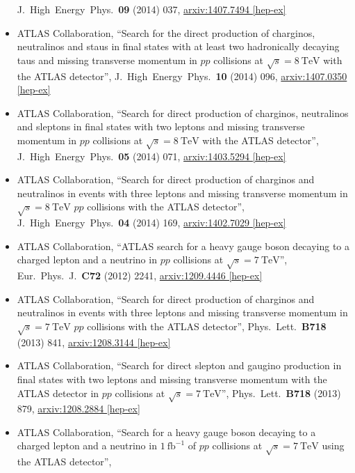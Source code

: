 \documentclass[a4paper,10pt]{article}
\begin{document}
\begin{itemize}
	J.\ High\ Energy\ Phys.\ {\bf 09} (2014) 037,
	\href{http://arxiv.org/abs/1407.7494}{arxiv:1407.7494 [hep-ex]}
	\item ATLAS Collaboration,
	``Search for the direct production of charginos, neutralinos and staus in final states with at least two hadronically decaying taus and missing transverse momentum in $pp$ collisions at $\sqrt{s} = 8\ \mathrm{TeV}$ with the ATLAS detector'',
	J.\ High\ Energy\ Phys.\ {\bf 10} (2014) 096,
	\href{http://arxiv.org/abs/1407.0350}{arxiv:1407.0350 [hep-ex]}
	\item ATLAS Collaboration,
	``Search for direct production of charginos, neutralinos and sleptons in final states with two leptons and missing transverse momentum in $pp$ collisions at
	$\sqrt{s} = 8\ \mathrm{TeV}$ with the ATLAS detector'',
	J.\ High\ Energy\ Phys.\ {\bf 05} (2014) 071,
	\href{http://arxiv.org/abs/1403.5294}{arxiv:1403.5294 [hep-ex]}
	\item ATLAS Collaboration,
	``Search for direct production of charginos and neutralinos in events with three leptons and missing transverse momentum in $\sqrt{s} = 8\ \mathrm{TeV}$ $pp$ collisions with the ATLAS detector'',
	J.\ High\ Energy\ Phys.\ {\bf 04} (2014) 169,
	\href{http://arxiv.org/abs/1402.7029}{arxiv:1402.7029 [hep-ex]}
	\item ATLAS Collaboration,
	``ATLAS search for a heavy gauge boson decaying to a charged lepton and a neutrino in $pp$ collisions at $\sqrt{s} = 7\ \mathrm{TeV}$'',
	Eur.\ Phys.\ J.\ {\bf C72} (2012) 2241,
	\href{http://arxiv.org/abs/1209.4446}{arxiv:1209.4446 [hep-ex]}
	\item ATLAS Collaboration,
	``Search for direct production of charginos and neutralinos in events with three leptons and missing transverse momentum in $\sqrt{s} = 7\ \mathrm{TeV}$ $pp$ collisions with the ATLAS detector'',
	Phys.\ Lett.\ {\bf B718} (2013) 841,
	\href{http://arxiv.org/abs/1208.3144}{arxiv:1208.3144 [hep-ex]}
	\item ATLAS Collaboration,
	``Search for direct slepton and gaugino production in final states with two leptons and missing transverse momentum with the ATLAS detector in $pp$ collisions at $\sqrt{s} = 7\ \mathrm{TeV}$'',
	Phys.\ Lett.\ {\bf B718} (2013) 879, \href{http://arxiv.org/abs/1208.2884}{arxiv:1208.2884 [hep-ex]}
	\item ATLAS Collaboration,
	``Search for a heavy gauge boson decaying to a charged lepton and a neutrino in $1\ \mathrm{fb}^{-1}$ of $pp$ collisions at $\sqrt{s} = 7\ \mathrm{TeV}$ using the ATLAS detector'',

\end{itemize}
\end{document}
